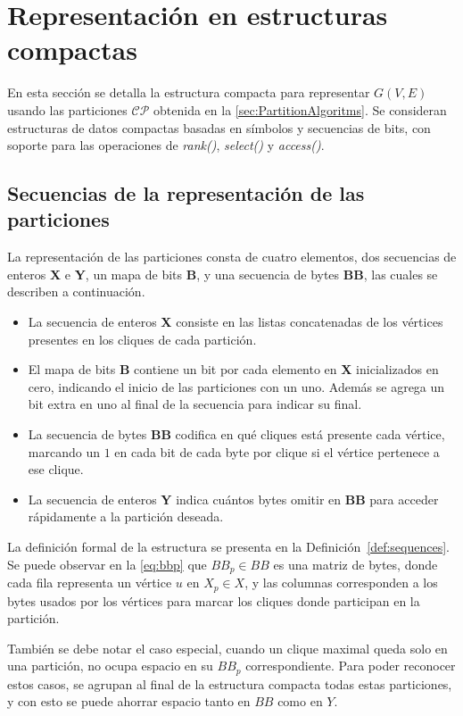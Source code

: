 \section{Representación en estructuras compactas}

En esta sección se detalla la estructura compacta para representar $G(V, E)$ usando las particiones $\mathcal{C}\mathcal{P}$ obtenida en la \autoref{sec:PartitionAlgoritms}. Se consideran estructuras de datos compactas  basadas en símbolos y secuencias de bits, con soporte para las operaciones de \textit{rank()}, \textit{select()} y \textit{access()}.

\subsection{Secuencias de la representación de las particiones}
La representación de las particiones consta de cuatro elementos, dos secuencias de enteros \textbf{X} e \textbf{Y}, un mapa de bits \textbf{B}, y una secuencia de bytes \textbf{BB}, las cuales se describen a continuación.

\begin{itemize}
	\item La secuencia de enteros \textbf{X} consiste en las listas concatenadas de los vértices presentes en los cliques de cada partición.
	\item El mapa de bits \textbf{B} contiene un bit por cada elemento en \textbf{X} inicializados en cero, indicando el inicio de las particiones con un uno. Además se agrega un bit extra en uno al final de la secuencia para indicar su final.
	\item La secuencia de bytes \textbf{BB} codifica en qué cliques está presente cada vértice, marcando un  $1$ en cada bit de cada byte por clique si el vértice pertenece a ese clique.
	\item La secuencia de enteros \textbf{Y} indica cuántos bytes omitir en \textbf{BB} para acceder rápidamente a la partición deseada.
\end{itemize}

La definición formal de la estructura se presenta en la Definición~\ref{def:sequences}. Se puede observar en la \autoref{eq:bbp} que $BB_{p} \in BB$ es una matriz de bytes, donde cada fila representa un vértice $u$ en $X_{p} \in X$, y las columnas corresponden a los bytes usados por los vértices para marcar los cliques donde participan en la partición. 

También se debe notar el caso especial, cuando un clique maximal queda solo en una partición, no ocupa espacio en su $BB_{p}$ correspondiente. Para poder reconocer estos casos, se agrupan al final de la estructura compacta todas estas particiones, y con esto se puede ahorrar espacio tanto en $BB$ como en $Y$.

